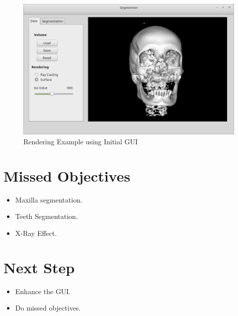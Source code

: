 \documentclass[12pt, b5paper]{article}
\begin{document}
\begin{figure}
    \centering
    \includegraphics[scale=0.5]{EX}
    \caption{Rendering Example using Initial GUI}
    \label{fig:EX}
\end{figure}

\section{Missed Objectives}
\begin{itemize}
\item Maxilla segmentation.
\item Teeth Segmentation.
\item X-Ray Effect.
\end{itemize}

\section{Next Step}
\begin{itemize}
\item Enhance the GUI. 
\item Do missed objectives.
\end{itemize}
\end{document}
